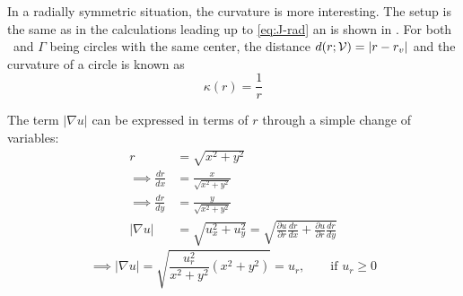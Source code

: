 In a radially symmetric situation, the curvature is more interesting. The setup is the same as in the calculations leading up to \eqref{eq:J-rad} an is shown in . For both \pointset\ and $\Gamma$ being circles with the same center, the distance $d(r; \mathcal{V}) = |r-r_v|$ and the curvature of a circle is known as
\begin{equation}
    \kappa(r) = \frac{1}{r}
    \label{eq:curvature-circle}
\end{equation}

The term $|\nabla u|$ can be expressed in terms of $r$ through a simple change of variables:
\begin{align*}
    r &=\sqrt{x^2+y^2} \\
    \implies \frac{dr}{dx} &= \frac{x}{\sqrt{x^2 + y^2}} \\
    \implies \frac{dr}{dy} &= \frac{y}{\sqrt{x^2+ y^2}} \\
    |\nabla u| &= \sqrt{u_x^2 + u_y^2} = \sqrt{\frac{\partial u}{\partial r} \frac{dr}{dx} + \frac{\partial u}{\partial r} \frac{dr}{dy}}
\end{align*}
\begin{equation}
    \implies |\nabla u | = \sqrt{\frac{u_r^2}{x^2+y^2} (x^2 + y^2)} = u_r, \qquad \text{if } u_r\geq 0
    \label{eq:nablau-ur}
\end{equation}

